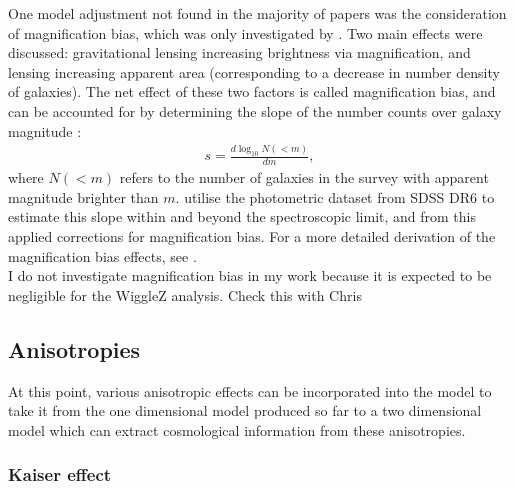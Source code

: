 \documentclass[titlesmallcaps, examinerscopy, copyrightpage]{uqthesis}
\newcommand{\red}{\color{red}}
\begin{document}
One model adjustment not found in the majority of papers was the consideration of magnification bias, which was only investigated by  \citet{Gaztanaga2009}. Two main effects were discussed: gravitational lensing increasing brightness via magnification, and lensing increasing apparent area (corresponding to a decrease in number density of galaxies). The net effect of these two factors is called magnification bias, and can be accounted for by determining the slope of the number counts over galaxy magnitude \citep{TurnerOstriker1984,  WebsterHewett1988, Fugmann1988, Narayan1989, Schneider1989, BroadhurstTaylor1995, MoessnerJain1998}:
\begin{align}
s = \frac{d \log_{10} N(<m)}{dm},
\end{align}
where $N(<m)$ refers to the number of galaxies in the survey with apparent magnitude brighter than $m$. \citet{Gaztanaga2009} utilise the photometric dataset from SDSS DR6 \citep[DR6:][]{Adelman2008} to estimate this slope within and beyond the spectroscopic limit, and from this applied corrections for magnification bias. For a more detailed derivation of the magnification bias effects, see \citet[\S 2.2]{Gaztanaga2009}.\\

I do not investigate magnification bias in my work because it is expected to be negligible for the WiggleZ analysis. {\red Check this with Chris}


\subsection{Anisotropies}

At this point, various anisotropic effects can be incorporated into the model to take it from the one dimensional model produced so far to a two dimensional model which can extract cosmological information from these anisotropies.

\subsubsection{Kaiser effect}
\end{document}

